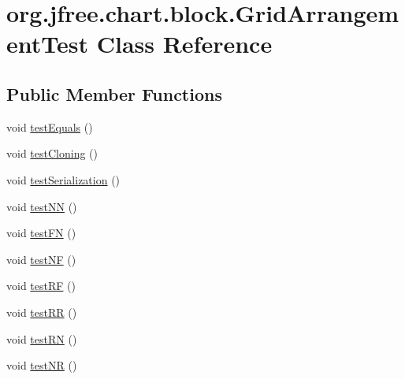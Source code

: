 \hypertarget{classorg_1_1jfree_1_1chart_1_1block_1_1_grid_arrangement_test}{}\section{org.\+jfree.\+chart.\+block.\+Grid\+Arrangement\+Test Class Reference}
\label{classorg_1_1jfree_1_1chart_1_1block_1_1_grid_arrangement_test}
\subsection*{Public Member Functions}
\begin{DoxyCompactItemize}
\item 
void \mbox{\hyperlink{classorg_1_1jfree_1_1chart_1_1block_1_1_grid_arrangement_test_a054811f0dd358ca80ca894cff49fd790}{test\+Equals}} ()
\item 
void \mbox{\hyperlink{classorg_1_1jfree_1_1chart_1_1block_1_1_grid_arrangement_test_aadc9ac563c51ab06eb0f5596c169caa0}{test\+Cloning}} ()
\item 
void \mbox{\hyperlink{classorg_1_1jfree_1_1chart_1_1block_1_1_grid_arrangement_test_af6ea97d769db6dc090b6e528a070ef27}{test\+Serialization}} ()
\item 
void \mbox{\hyperlink{classorg_1_1jfree_1_1chart_1_1block_1_1_grid_arrangement_test_af00b2beeea187b70d1193434e1a73a3b}{test\+NN}} ()
\item 
void \mbox{\hyperlink{classorg_1_1jfree_1_1chart_1_1block_1_1_grid_arrangement_test_a3cc956e4fae245d8d0b1d8049026aeac}{test\+FN}} ()
\item 
void \mbox{\hyperlink{classorg_1_1jfree_1_1chart_1_1block_1_1_grid_arrangement_test_a7869cbfc7a1ae079e13326c1e1ee3f83}{test\+NF}} ()
\item 
void \mbox{\hyperlink{classorg_1_1jfree_1_1chart_1_1block_1_1_grid_arrangement_test_aad5c7474d8843c9e43ffc315349fa6d8}{test\+RF}} ()
\item 
void \mbox{\hyperlink{classorg_1_1jfree_1_1chart_1_1block_1_1_grid_arrangement_test_a3394705bac0ba60a3adf6dffa7f1cec9}{test\+RR}} ()
\item 
void \mbox{\hyperlink{classorg_1_1jfree_1_1chart_1_1block_1_1_grid_arrangement_test_aec6e9e828a133d12b83d945ab3c71cf5}{test\+RN}} ()
\item 
void \mbox{\hyperlink{classorg_1_1jfree_1_1chart_1_1block_1_1_grid_arrangement_test_a4b738c439d714d3e2a5d7084e3798896}{test\+NR}} ()
\item 

\end{DoxyCompactItemize}
